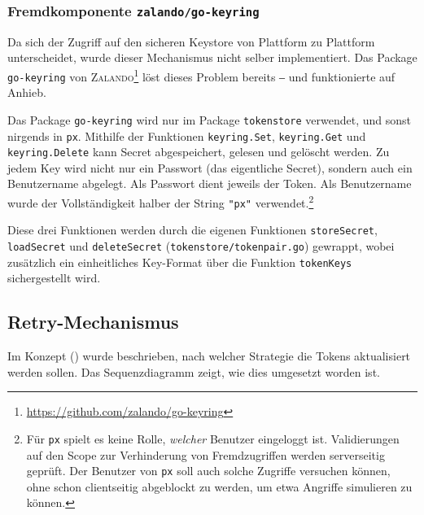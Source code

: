 \subsubsection{Fremdkomponente \texttt{zalando/go-keyring}}
\label{sec:Go-Keyring}

Da sich der Zugriff auf den sicheren Keystore von Plattform zu Plattform unterscheidet, wurde dieser Mechanismus nicht selber implementiert. Das Package \texttt{go-keyring} von \textsc{Zalando}\footnote{\url{https://github.com/zalando/go-keyring}} löst dieses Problem bereits ‒ und funktionierte auf Anhieb.

Das Package \texttt{go-keyring} wird nur im Package \texttt{tokenstore} verwendet, und sonst nirgends in \texttt{px}. Mithilfe der Funktionen \texttt{keyring.Set}, \texttt{keyring.Get} und \texttt{keyring.Delete} kann Secret abgespeichert, gelesen und gelöscht werden. Zu jedem Key wird nicht nur ein Passwort (das eigentliche Secret), sondern auch ein Benutzername abgelegt. Als Passwort dient jeweils der Token. Als Benutzername wurde der Vollständigkeit halber der String \texttt{"px"} verwendet.\footnote{Für \texttt{px} spielt es keine Rolle, \textit{welcher} Benutzer eingeloggt ist. Validierungen auf den Scope zur Verhinderung von Fremdzugriffen werden serverseitig geprüft. Der Benutzer von \texttt{px} soll auch solche Zugriffe versuchen können, ohne schon clientseitig abgeblockt zu werden, um etwa Angriffe simulieren zu können.}

Diese drei Funktionen werden durch die eigenen Funktionen \texttt{storeSecret}, \texttt{loadSecret} und \texttt{deleteSecret} (\texttt{tokenstore/tokenpair.go}) gewrappt, wobei zusätzlich ein einheitliches Key-Format über die Funktion \texttt{tokenKeys} sichergestellt wird.

\subsection{Retry-Mechanismus}
\label{sec:Retry-Mechanismus}

Im Konzept () wurde beschrieben, nach welcher Strategie die Tokens aktualisiert werden sollen. Das Sequenzdiagramm  zeigt, wie dies umgesetzt worden ist.

